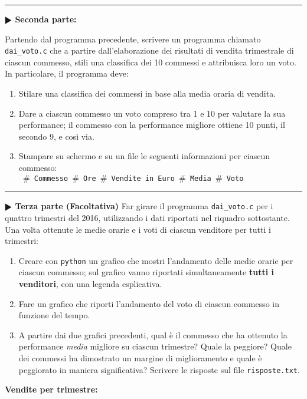 \documentclass[11pt]{article}
\begin{document}
\hrule
\vspace{2mm}
\textbf{$\RHD$ Seconda parte:}

Partendo dal programma precedente, scrivere un programma chiamato \texttt{dai\_voto.c} che a partire dall'elaborazione dei risultati di
vendita trimestrale di ciascun commesso, stili una classifica dei 10 commessi e attribuisca loro
un voto. In particolare, il programma deve: 
\begin{enumerate}
\item Stilare una classifica dei commessi in base alla media oraria di vendita.
\item Dare a ciascun commesso un voto compreso tra 1 e 10 per valutare la sua performance; il commesso con la performance migliore ottiene 10 punti, il secondo 9, e così via.
\item Stampare su schermo e su un file le seguenti informazioni per ciascun commesso:\\
\texttt{
$\#$  Commesso $\#$ Ore $\#$ Vendite in Euro $\#$ Media $\#$ Voto\\
}
\end{enumerate}


\hrule
\vspace{2mm}
\textbf{$\RHD$ Terza parte (Facoltativa)}
Far girare il programma \texttt{dai\_voto.c} per i quattro trimestri del 2016, utilizzando i dati riportati nel riquadro sottostante. Una volta ottenute le medie orarie e i voti di ciascun venditore per tutti i trimestri:
\begin{enumerate}
\item Creare con \texttt{python} un grafico che mostri l'andamento delle medie orarie per ciascun commesso; sul grafico vanno riportati simultaneamente {\bf tutti i venditori}, con una legenda esplicativa.
\item Fare un grafico che riporti l'andamento del voto di ciascun commesso in funzione del tempo.
\item A partire dai due grafici precedenti, qual è il commesso che ha ottenuto la performance {\em media\/} migliore su ciascun trimestre? Quale la peggiore?
Quale dei commessi ha dimostrato un margine di miglioramento e quale \`e peggiorato in maniera significativa?
Scrivere le risposte sul file \texttt{risposte.txt}.
\end{enumerate}


{\bf Vendite per trimestre:}
\end{document}
